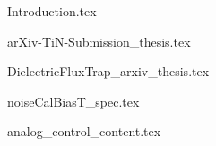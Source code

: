 





\begin{frontmatter}










\cleardoublepage
{}
\begin{singlespace}
\tableofcontents
\end{singlespace}

\end{frontmatter}

\pagestyle{plain} %

{Introduction.tex}

{arXiv-TiN-Submission_thesis.tex}

{DielectricFluxTrap_arxiv_thesis.tex}

{noiseCalBiasT_spec.tex}



{analog_control_content.tex}



%
%
\printbibliography


